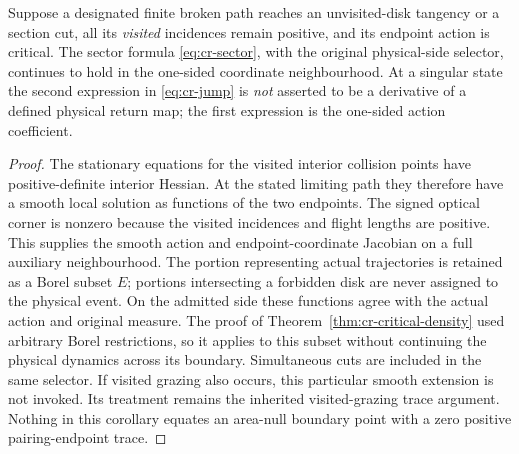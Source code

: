 \begin{corollary}
\label{cor:cr-one-sided}
Suppose a designated finite broken path reaches an unvisited-disk
tangency or a section cut, all its \emph{visited} incidences remain
positive, and its endpoint action is critical. The sector formula
\eqref{eq:cr-sector}, with the original physical-side selector,
continues to hold in the one-sided coordinate neighbourhood.
At a singular state the second expression in \eqref{eq:cr-jump}
is \emph{not} asserted to be a derivative of a defined physical
return map; the first expression is the one-sided action coefficient.
\end{corollary}
\begin{proof}
The stationary equations for the visited interior collision points
have positive-definite interior Hessian. At the stated limiting path
they therefore have a smooth local solution as functions of the two
endpoints. The signed optical corner is nonzero because the
visited incidences and flight lengths are positive. This supplies
the smooth action and endpoint-coordinate Jacobian on a full
auxiliary neighbourhood. The portion representing actual trajectories
is retained as a Borel subset $E$; portions intersecting a forbidden
disk are never assigned to the physical event. On the admitted side
these functions agree with the actual action and original measure.
The proof of Theorem~\ref{thm:cr-critical-density} used arbitrary
Borel restrictions, so it applies to this subset without continuing
the physical dynamics across its boundary. Simultaneous cuts are
included in the same selector. If visited grazing also occurs, this
particular smooth extension is not invoked. Its treatment remains
the inherited visited-grazing trace argument. Nothing in this
corollary equates an area-null boundary point with a zero positive
pairing-endpoint trace.
\end{proof}

